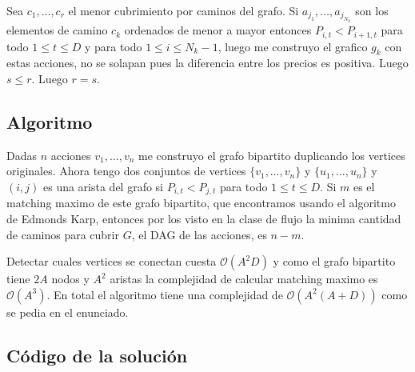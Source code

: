 	Sea $c_1,\dots ,c_r$ el menor cubrimiento por caminos del
	grafo. Si $a_{j_1},\dots ,a_{j_{N_k}}$ son los elementos de
	camino $c_k$ ordenados de menor a mayor entonces $P_{i,t}<P_{i+1,t}$
	para todo $1\leq t\leq D$ y para todo $1\leq i\leq N_k-1$, 
	luego me construyo el grafico $g_k$ con estas acciones, no se
	solapan pues la diferencia entre los precios es positiva.
	Luego $s\leq r$.
	Luego $r=s$.
	
\subsection{Algoritmo}
	
		
	
	
	Dadas $n$ acciones $ v_1,\dots ,v_n$ me construyo el grafo bipartito
	duplicando los vertices originales. Ahora tengo dos conjuntos
	de vertices $\{ v_1,\dots ,v_n\} $ y $\{ u_1,\dots ,u_n\} $ y
	$(i,j)$ es una arista del grafo si $P_{i,t}<P_{j,t}$ para todo $1\leq t\leq D$.
	Si $m$ es el matching maximo de este grafo bipartito, que encontramos
	usando el algoritmo de Edmonds Karp, entonces por los visto en la
	clase de flujo la minima cantidad de caminos para cubrir $G$, el DAG 
	de las acciones, es $n-m$.
	
	
	Detectar cuales vertices se conectan cuesta $\mathcal{O}(A^2D)$ y como el grafo
	bipartito tiene $2A$ nodos y $A^2$ aristas la complejidad de 
	calcular matching maximo es $\mathcal{O}(A^3)$.
	En total el algoritmo tiene una complejidad de $\mathcal{O}(A^2(A+D))$ como
	se pedia en el enunciado.
\newpage
\subsection{Código de la solución}
\lstset{inputencoding=utf8/latin1}

